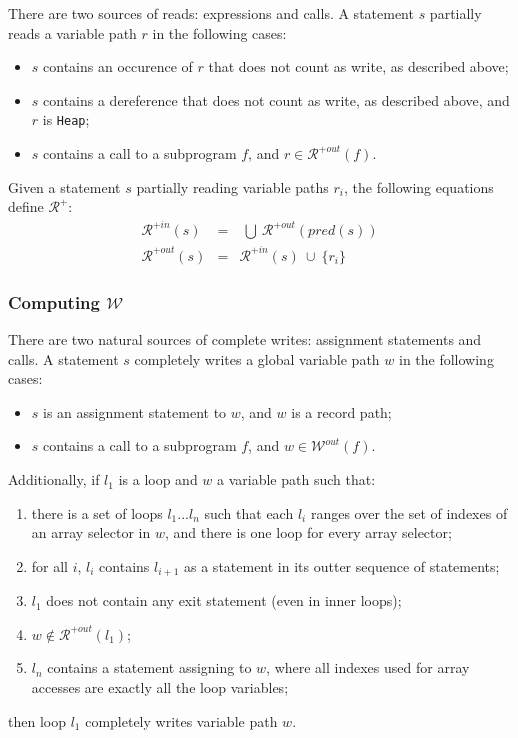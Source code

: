 \documentclass[fullpage]{article}
\newcommand{\code}[1]{\texttt{#1}}
\newcommand{\heap}{\code{Heap}\xspace}
\newcommand{\pred}[1]{\ensuremath{\mathit{pred}(#1)}\xspace}
\newcommand{\writes}{$\mathcal{W}$\xspace}
\newcommand{\outwrites}[1]{\ensuremath{\mathcal{W}^{out}(#1)}\xspace}
\newcommand{\allreads}{$\mathcal{R^+}$\xspace}
\newcommand{\inallreads}[1]{\ensuremath{\mathcal{R}^{+in}(#1)}\xspace}
\newcommand{\outallreads}[1]{\ensuremath{\mathcal{R}^{+out}(#1)}\xspace}
\newcommand{\union}{~\cup~}
\newcommand{\bigunion}{~\bigcup~}
\begin{document}
There are two sources of reads: expressions and calls. A statement $s$
partially reads a variable path $r$ in the following cases:
\begin{itemize}
\item $s$ contains an occurence of $r$ that does not count as write, as
  described above;
\item $s$ contains a dereference that does not count as write, as described
  above, and $r$ is \heap;
\item $s$ contains a call to a subprogram $f$, and $r \in \outallreads{f}$.
\end{itemize}

Given a statement $s$ partially reading variable paths $r_i$, the following
equations define \allreads:
\begin{eqnarray*}
\inallreads{s} &=& \bigunion \outallreads{\pred{s}}\\
\outallreads{s} &=& \inallreads{s} \union \{r_i\}
\end{eqnarray*}

\subsubsection{Computing \writes}

There are two natural sources of complete writes: assignment statements and
calls. A statement $s$ completely writes a global variable path $w$ in the
following cases:
\begin{itemize}
\item $s$ is an assignment statement to $w$, and $w$ is a record path;
\item $s$ contains a call to a subprogram $f$, and $w \in \outwrites{f}$.
\end{itemize}
Additionally, if $l_1$ is a loop and $w$ a variable path such that:
\begin{enumerate}
\item there is a set of loops $l_1...l_n$ such that each $l_i$ ranges over the
  set of indexes of an array selector in $w$, and there is one loop for every
  array selector;
\item for all $i$, $l_i$ contains
  $l_{i+1}$ as a statement in its outter sequence of statements;
\item $l_1$ does not contain any exit statement (even in inner loops);
\item $w \notin \outallreads{l_1}$;
\item $l_n$ contains a statement assigning to $w$, where all indexes used for
  array accesses are exactly all the loop variables;
\end{enumerate}
then loop $l_1$ completely writes variable path $w$.
\end{document}
